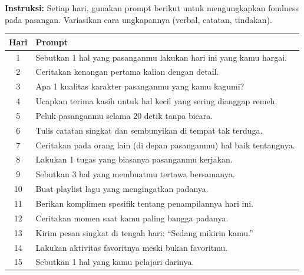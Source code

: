 \begin{exercisebox}
\textbf{Instruksi:} Setiap hari, gunakan prompt berikut untuk mengungkapkan fondness pada pasangan. Variasikan cara ungkapannya (verbal, catatan, tindakan).

\renewcommand{\arraystretch}{1.4}
\begin{tabular}{|c|>{\raggedright\arraybackslash}p{10cm}|}
\hline
\rowcolor{primary!20}
\textbf{Hari} & \textbf{Prompt} \\
\hline
1 & Sebutkan 1 hal yang pasanganmu lakukan hari ini yang kamu hargai. \\
\hline
2 & Ceritakan kenangan pertama kalian dengan detail. \\
\hline
3 & Apa 1 kualitas karakter pasanganmu yang kamu kagumi? \\
\hline
4 & Ucapkan terima kasih untuk hal kecil yang sering dianggap remeh. \\
\hline
5 & Peluk pasanganmu selama 20 detik tanpa bicara. \\
\hline
6 & Tulis catatan singkat dan sembunyikan di tempat tak terduga. \\
\hline
7 & Ceritakan pada orang lain (di depan pasanganmu) hal baik tentangnya. \\
\hline
8 & Lakukan 1 tugas yang biasanya pasanganmu kerjakan. \\
\hline
9 & Sebutkan 3 hal yang membuatmu tertawa bersamanya. \\
\hline
10 & Buat playlist lagu yang mengingatkan padanya. \\
\hline
11 & Berikan komplimen spesifik tentang penampilannya hari ini. \\
\hline
12 & Ceritakan momen saat kamu paling bangga padanya. \\
\hline
13 & Kirim pesan singkat di tengah hari: ``Sedang mikirin kamu.'' \\
\hline
14 & Lakukan aktivitas favoritnya meski bukan favoritmu. \\
\hline
15 & Sebutkan 1 hal yang kamu pelajari darinya. \\
\hline
\end{tabular}
\end{exercisebox}

